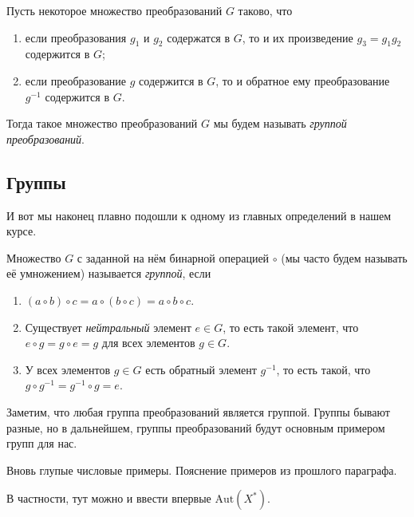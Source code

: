 	\begin{definition} 
		Пусть некоторое множество преобразований $G$ таково, что 
		\begin{enumerate}
		 	\item если преобразования $g_1$ и $g_2$ содержатся в $G$, то и их произведение $g_3 = g_1g_2$ содержится в $G$;
		 	\item если преобразование $g$ содержится в $G$, то и обратное ему преобразование $g^{-1}$ содержится в $G$.
		 \end{enumerate}
		 Тогда такое множество преобразований $G$ мы будем называть \emph{группой преобразований}.
	\end{definition}
	

	\subsection{Группы}

	И вот мы наконец плавно подошли к одному из главных определений в нашем курсе. 

	\begin{definition} 
		Множество $G$ с заданной на нём бинарной операцией $\circ$ (мы часто будем называть её умножением) называется \emph{группой}, если 
		\begin{enumerate}
			\item $(a \circ b) \circ c = a \circ (b \circ c) = a \circ b \circ c$. 
			\item Существует \emph{нейтральный} элемент $e \in G$, то есть такой элемент, что $e \circ g = g \circ e = g$ для всех элементов $g \in G$. 
			\item У всех элементов $g \in G$ есть обратный элемент $g^{-1}$, то есть такой, что $g \circ g^{-1} = g^{-1} \circ g = e$.
		\end{enumerate}
	\end{definition}

	\begin{remark}
		Заметим, что любая группа преобразований является группой. Группы бывают разные, но в дальнейшем, группы преобразований будут основным примером групп для нас. 
	\end{remark}

	\begin{example}
		Вновь глупые числовые примеры. Пояснение примеров из прошлого параграфа. 
	\end{example}

	\begin{example}
		В частности, тут можно и ввести впервые $\mathrm{Aut}(X^*)$.
	\end{example}



